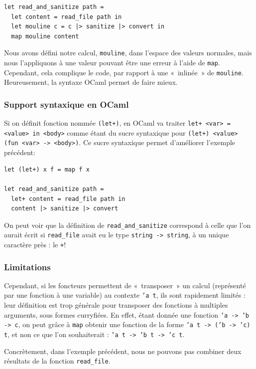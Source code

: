 \documentclass[final]{jflart}
\begin{document}
\begin{verbatim}
let read_and_sanitize path =
  let content = read_file path in
  let mouline c = c |> sanitize |> convert in
  map mouline content
\end{verbatim}

Nous avons défini notre calcul, \texttt{mouline}, dans l'espace des valeurs
normales, mais nous l'appliquons à une valeur pouvant être une erreur à l'aide
de \texttt{map}. Cependant, cela complique le code, par rapport à une «~inlinée~» de \texttt{mouline}. Heureusement, la syntaxe OCaml permet de faire
mieux.

\subsubsection{Support syntaxique en OCaml}

Si on définit fonction nommée \texttt{(let+)}, en OCaml va traiter
\texttt{let+ <var> = <value> in <body>} comme étant du sucre syntaxique pour
\texttt{(let+) <value> (fun <var> -> <body>)}. Ce sucre syntaxique permet d'améliorer
l'exemple précédent:

\begin{verbatim}
let (let+) x f = map f x

let read_and_sanitize path =
  let+ content = read_file path in
  content |> sanitize |> convert
\end{verbatim}

On peut voir que la définition de \texttt{read\_and\_sanitize} correspond à celle que l'on
aurait écrit si \texttt{read\_file} avait eu le type \texttt{string -> string}, à
un unique caractère près : le \texttt{+}!

\subsubsection{Limitations}
\label{limitations1}

Cependant, si les foncteurs permettent de «~transposer~» un calcul (représenté par une
fonction à une variable) au contexte \texttt{'a t}, ils sont rapidement limités : leur définition
est trop générale pour transposer des fonctions à multiples arguments,
sous formes curryfiées. En effet, étant donnée une fonction \texttt{'a -> 'b ->
  c}, on peut grâce à \texttt{map} obtenir une fonction de la forme \texttt{'a t
  -> ('b -> 'c) t}, et non ce que l'on souhaiterait : \texttt{'a t -> 'b t -> 'c
  t}.

Concrètement, dans l'exemple précédent, nous ne pouvons pas combiner deux
résultats de la fonction \texttt{read\_file}.
\end{document}
